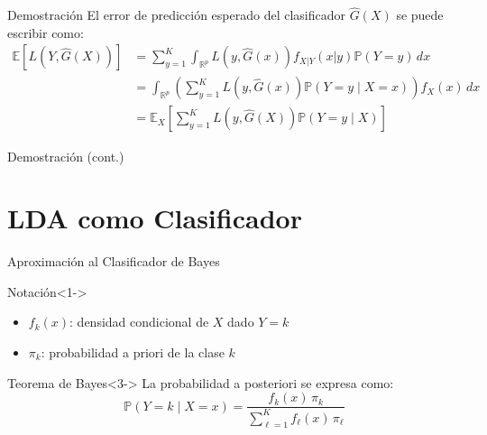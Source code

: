 \documentclass[spanish,handout]{beamer}
\begin{document}
\begin{frame}{Demostración}
El error de predicción esperado del clasificador $\hat{G}(X)$ se puede escribir como:
\begin{align*}
\mathbb{E}[L(Y, \hat{G}(X))] & = \sum_{y=1}^K \int_{\mathbb{R}^{p}} L(y, \hat{G}(x)) f_{X|Y}(x|y)\mathbb{P}(Y=y)\, dx \\
& = \int_{\mathbb{R}^{p}} \left( \sum_{y=1}^K L(y, \hat{G}(x)) \mathbb{P}(Y = y \mid X = x) \right) f_X(x) \, dx \\
& = \mathbb{E}_X\left[ \sum_{y=1}^K L(y, \hat{G}(X)) \mathbb{P}(Y = y \mid X) \right]
\end{align*}
\end{frame}

\begin{frame}{Demostración (cont.)}

\end{frame}

\section{LDA como Clasificador}

\begin{frame}{Aproximación al Clasificador de Bayes}
\begin{block}{Notación}<1->
\begin{itemize}[<+->]
    \item $f_k(x)$: densidad condicional de $X$ dado $Y = k$
    \item $\pi_k$: probabilidad a priori de la clase $k$
\end{itemize}
\end{block}

\begin{block}{Teorema de Bayes}<3->
La probabilidad a posteriori se expresa como:
\[
\mathbb{P}(Y = k \mid X = x) = \frac{f_k(x) \, \pi_k}{\sum_{\ell=1}^K f_\ell(x) \, \pi_\ell}
\]
\end{block}
\end{frame}
\end{document}
